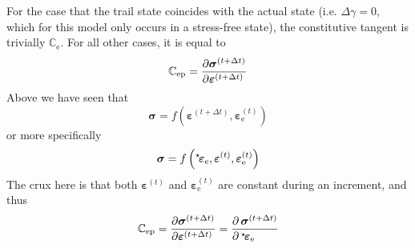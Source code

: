 \documentclass[times,namecite]{goose-article}
\newcommand\leftstar[1]{\hspace*{-.3em}~^\star\!#1}
\begin{document}
For the case that the trail state coincides with the actual state (i.e. $\Delta \gamma = 0$, which for this model only occurs in a stress-free state), the constitutive tangent is trivially $\mathbb{C}_\mathrm{e}$. For all other cases, it is equal to
\begin{equation}
  \mathbb{C}_\mathrm{ep}
  =
  \frac{
    \partial  \bm{\sigma}^{(t+\Delta t)} \hfill
  }{
    \partial \bm{\varepsilon}^{(t+\Delta t)} \hfill
  }
\end{equation}
Above we have seen that
\begin{equation}
  \bm{\sigma} = f \left( \bm{\varepsilon}^{(t+\Delta t)}, \bm{\varepsilon}_\mathrm{e}^{(t)}  \right)
\end{equation}
or more specifically
\begin{equation}
  \bm{\sigma} = f \left( \leftstar{\bm{\varepsilon}}_\mathrm{e}, \bm{\varepsilon}^{(t)}, \bm{\varepsilon}_\mathrm{e}^{(t)}  \right)
\end{equation}
The crux here is that both $\bm{\varepsilon}^{(t)}$ and $\bm{\varepsilon}_\mathrm{e}^{(t)}$ are constant during an increment, and thus
\begin{equation}
\mathbb{C}_\mathrm{ep}
=
\frac{
  \partial  \bm{\sigma}^{(t+\Delta t)} \hfill
}{
  \partial \bm{\varepsilon}^{(t+\Delta t)} \hfill
} =
\frac{
  \partial \, \bm{\sigma}^{(t+\Delta t)} \hfill
}{
  \partial \, \leftstar{\bm{\varepsilon}}_\mathrm{e} \hfill
}
\end{equation}
\end{document}

